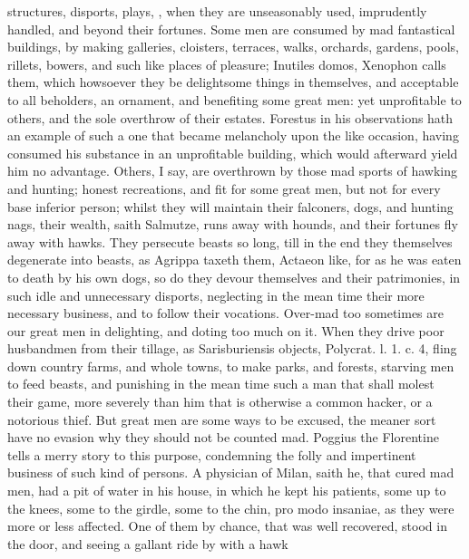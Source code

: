 {{structures, disports, plays, \etc{}, when they are unseasonably used,
imprudently handled, and beyond their fortunes. Some men are consumed
by mad fantastical buildings, by making galleries, cloisters, terraces,
walks, orchards, gardens, pools, rillets, bowers, and such like places
of pleasure; Inutiles domos, Xenophon calls them, which howsoever
they be delightsome things in themselves, and acceptable to all
beholders, an ornament, and benefiting some great men: yet unprofitable
to others, and the sole overthrow of their estates. Forestus in his
observations hath an example of such a one that became melancholy upon
the like occasion, having consumed his substance in an unprofitable
building, which would afterward yield him no advantage. Others, I say,
are  overthrown by those mad sports of hawking and hunting;
honest recreations, and fit for some great men, but not for every base
inferior person; whilst they will maintain their falconers, dogs, and
hunting nags, their wealth, saith Salmutze, runs away with
hounds, and their fortunes fly away with hawks. They persecute beasts
so long, till in the end they themselves degenerate into beasts, as
Agrippa taxeth them, Actaeon like, for as he was eaten to
death by his own dogs, so do they devour themselves and their
patrimonies, in such idle and unnecessary disports, neglecting in the
mean time their more necessary business, and to follow their vocations.
Over-mad too sometimes are our great men in delighting, and doting too
much on it. When they drive poor husbandmen from their tillage,
as Sarisburiensis objects, Polycrat. l. 1. c. 4, fling down
country farms, and whole towns, to make parks, and forests, starving
men to feed beasts, and punishing in the mean time such a man
that shall molest their game, more severely than him that is otherwise
a common hacker, or a notorious thief. But great men are some ways to
be excused, the meaner sort have no evasion why they should not be
counted mad. Poggius the Florentine tells a merry story to this
purpose, condemning the folly and impertinent business of such kind of
persons. A physician of Milan, saith he, that cured mad men, had a pit
of water in his house, in which he kept his patients, some up to the
knees, some to the girdle, some to the chin, pro modo insaniae, as they
were more or less affected. One of them by chance, that was well
recovered, stood in the door, and seeing a gallant ride by with a hawk
}}
